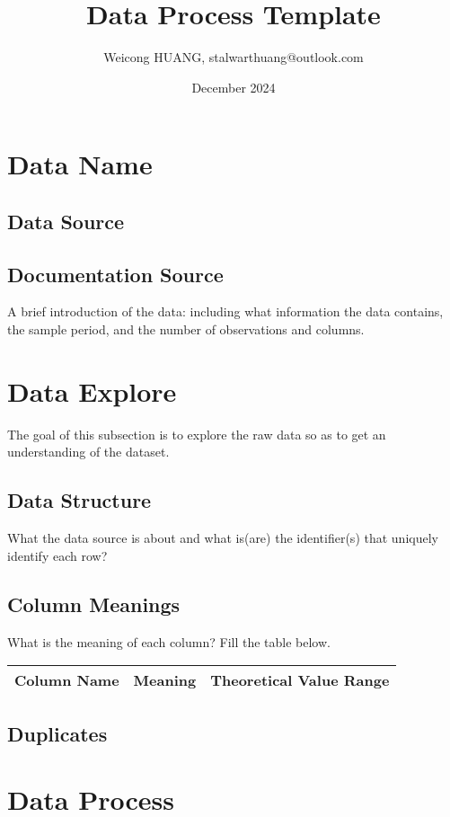 \documentclass{article}
\title{Data Process Template}
\author{Weicong HUANG, stalwarthuang@outlook.com}
\date{December 2024}
\begin{document}
\maketitle

\section{Data Name}
\subsection{Data Source}
\subsection{Documentation Source}
A brief introduction of the data: including what information the data contains, the sample period, and the number of observations and columns.

\section{Data Explore}
The goal of this subsection is to explore the raw data so as to get an understanding of the dataset.

\subsection{Data Structure}
What the data source is about and what is(are) the identifier(s) that uniquely identify each row?

\subsection{Column Meanings}
What is the meaning of each column? Fill the table below.

\begin{longtable}{lll}
\toprule
Column Name & Meaning & Theoretical Value Range \\
\midrule
\endhead
\bottomrule
\end{longtable}

\subsection{Duplicates}

\section{Data Process}
\end{document}

